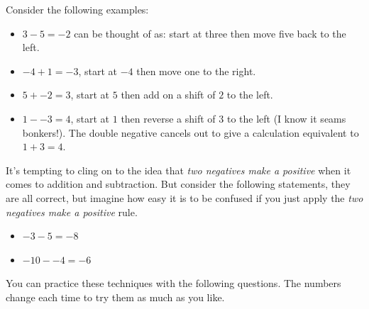 \documentclass[
  a4paper,
]{scrbook}
\providecommand{\tightlist}{%
  \setlength{\itemsep}{0pt}\setlength{\parskip}{0pt}}\usepackage{longtable,booktabs,array}
\begin{document}
Consider the following examples:

\begin{itemize}
\tightlist
\item
  \(3 - 5 = -2\) can be thought of as: start at three then move five
  back to the left.
\item
  \(-4 + 1 = -3\), start at \(-4\) then move one to the right.
\item
  \(5 + - 2 = 3\), start at \(5\) then add on a shift of \(2\) to the
  left.
\item
  \(1 - - 3 = 4\), start at \(1\) then reverse a shift of \(3\) to the
  left (I know it seams bonkers!). The double negative cancels out to
  give a calculation equivalent to \(1 + 3 = 4\).
\end{itemize}

\begin{tcolorbox}[enhanced jigsaw, opacityback=0, left=2mm, toptitle=1mm, title=\textcolor{quarto-callout-warning-color}{\faExclamationTriangle}\hspace{0.5em}{Warning}, breakable, colbacktitle=quarto-callout-warning-color!10!white, opacitybacktitle=0.6, bottomtitle=1mm, arc=.35mm, colback=white, leftrule=.75mm, bottomrule=.15mm, colframe=quarto-callout-warning-color-frame, rightrule=.15mm, titlerule=0mm, toprule=.15mm, coltitle=black]

It's tempting to cling on to the idea that \emph{two negatives make a
positive} when it comes to addition and subtraction. But consider the
following statements, they are all correct, but imagine how easy it is
to be confused if you just apply the \emph{two negatives make a
positive} rule.

\begin{itemize}
\tightlist
\item
  \(-3 - 5 = -8\)
\item
  \(-10 - -4 = -6\)
\end{itemize}

\end{tcolorbox}

You can practice these techniques with the following questions. The
numbers change each time to try them as much as you like.
\end{document}
